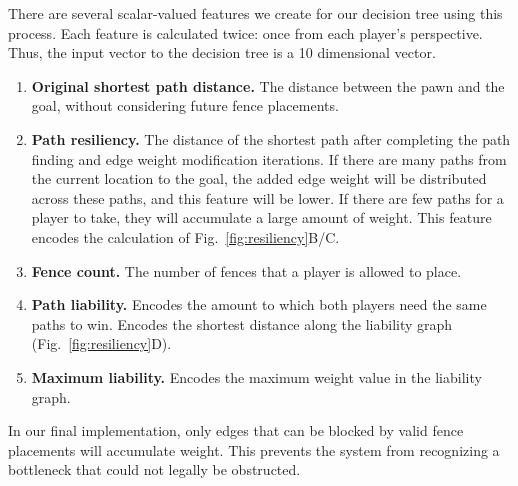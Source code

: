 \documentclass[10pt]{article}
\begin{document}
There are several scalar-valued features we create for our decision tree using this process. Each feature is calculated twice: once from each player's perspective. Thus, the input vector to the decision tree is a 10 dimensional vector.

\begin{enumerate}
    \item \textbf{Original shortest path distance.} The distance between the pawn and the goal, without considering future fence placements.
    \item \textbf{Path resiliency.} The distance of the shortest path after completing the path finding and edge weight modification iterations. If there are many paths from the current location to the goal, the added edge weight will be distributed across these paths, and this feature will be lower. If there are few paths for a player to take, they will accumulate a large amount of weight. This feature encodes the calculation of Fig.~\ref{fig:resiliency}B/C.
    \item \textbf{Fence count.} The number of fences that a player is allowed to place.
    \item \textbf{Path liability.} Encodes the amount to which both players need the same paths to win. Encodes the shortest distance along the liability graph (Fig.~\ref{fig:resiliency}D).
    \item \textbf{Maximum liability.} Encodes the maximum weight value in the liability graph.
\end{enumerate}

In our final implementation, only edges that can be blocked by valid fence placements will accumulate weight. This prevents the system from recognizing a bottleneck that could not legally be obstructed.

\end{document}
